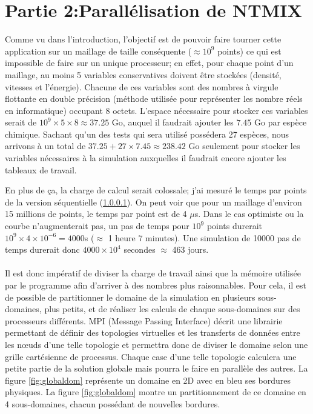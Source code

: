 \section{Partie 2:Parallélisation de NTMIX}


Comme vu dans l'introduction, l'objectif est de pouvoir faire tourner cette application sur un maillage de taille conséquente ($\approx 10^9$ points) ce qui est impossible de faire sur un unique processeur; en effet, pour chaque point d'un maillage, au moins 5 variables conservatives doivent être stockées (densité, vitesses et l'énergie). Chacune de ces variables sont des nombres à virgule flottante en double précision (méthode utilisée pour représenter les nombre réels en informatique) occupant 8 octets. L'espace nécessaire pour stocker ces variables serait de $10^9 \times 5 \times 8 \approx 37.25$ Go, auquel il faudrait ajouter les $7.45$ Go par espèce chimique. Sachant qu'un des tests qui sera utilisé possédera 27 espèces, nous arrivons à un total de $37.25+27 \times 7.45\approx 238.42$ Go seulement pour stocker les variables nécessaires à la simulation auxquelles il faudrait encore ajouter les tableaux de travail.





En plus de ça, la charge de calcul serait colossale; j'ai mesuré le temps par points de la version séquentielle (\ref{}). On peut voir que pour un maillage d'environ 15 millions de points, le temps par point est de 4 $\mu$s. Dans le cas optimiste ou la courbe n'augmenterait pas, un pas de temps pour $10^9$ points durerait $10^9\times4\times10^{-6}=4000$s ($\approx$ 1 heure 7 minutes). Une simulation de 10000 pas de temps durerait donc $4000\times10^4$ secondes $\approx$ 463 jours.


\paragraph{}Il est donc impératif de diviser la charge de travail ainsi que la mémoire utilisée par le programme afin d'arriver à des nombres plus raisonnables. 
Pour cela, il est de possible de partitionner le domaine de la simulation en plusieurs sous-domaines, plus petits, et de réaliser les calculs de chaque sous-domaines sur des processeurs différents. MPI (Message Passing Interface) décrit une librairie permettant de définir des topologies virtuelles et les transferts de données entre les nœuds d'une telle topologie et permettra donc de diviser le domaine selon une grille cartésienne de processus. Chaque case d'une telle topologie calculera une petite partie de la solution globale mais pourra le faire en parallèle des autres. La figure \ref{fig:globaldom} représente un domaine en 2D avec en bleu ses bordures physiques. La figure \ref{fig:globaldom} montre un partitionnement de ce domaine en 4 sous-domaines, chacun possédant de nouvelles bordures.

